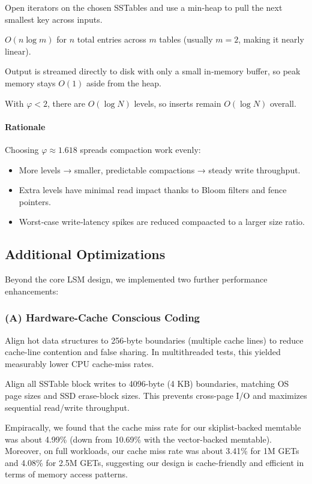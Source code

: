 \documentclass[10pt]{article}
\begin{document}
\begin{description}[leftmargin=1em,labelwidth=*,itemsep=0.5ex]
  \item[Streaming Merge] Open iterators on the chosen SSTables and use a min‐heap to pull the next smallest key across inputs.
  \item[Time Complexity] $O(n\log m)$ for $n$ total entries across $m$ tables (usually $m=2$, making it nearly linear).
  \item[Space Efficiency] Output is streamed directly to disk with only a small in‐memory buffer, so peak memory stays $O(1)$ aside from the heap.
  \item[Amortized Levels] With $\varphi<2$, there are $O(\log N)$ levels, so inserts remain $O(\log N)$ overall.
\end{description}

\paragraph{Rationale}
Choosing $\varphi\approx1.618$ spreads compaction work evenly:
\begin{itemize}[itemsep=0.25ex]
  \item More levels → smaller, predictable compactions → steady write throughput.
  \item Extra levels have minimal read impact thanks to Bloom filters and fence pointers.
  \item Worst‐case write‐latency spikes are reduced compaacted to a larger size ratio.
\end{itemize}

\subsection{Additional Optimizations}

Beyond the core LSM design, we implemented two further performance enhancements:

\subsubsection*{(A) Hardware-Cache Conscious Coding}
\begin{description}[leftmargin=1em,labelwidth=*,itemsep=0.5ex]
  \item[256-Byte Alignment]
    Align hot data structures to 256-byte boundaries (multiple cache lines) to reduce cache-line contention and false sharing. In multithreaded tests, this yielded measurably lower CPU cache-miss rates.
  \item[4 KB Page Alignment]
    Align all SSTable block writes to 4096-byte (4 KB) boundaries, matching OS page sizes and SSD erase-block sizes. This prevents cross-page I/O and maximizes sequential read/write throughput.
  \item[Great Cache Locality]
    Empiracally, we found that the cache miss rate for our skiplist-backed memtable was about 4.99\% (down from 10.69\% with the vector-backed memtable).
    Moreover, on full workloads, our cache miss rate was about 3.41\% for 1M GETs and 4.08\% for 2.5M GETs, suggesting our design is cache-friendly and efficient in terms of memory access patterns.
\end{description}
\end{document}

